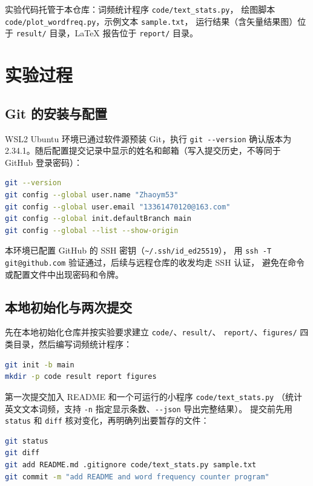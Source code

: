 \documentclass{SYSUReport}
\begin{document}
实验代码托管于本仓库：词频统计程序 \texttt{code/text\_stats.py}，
绘图脚本 \texttt{code/plot\_wordfreq.py}，示例文本 \texttt{sample.txt}，
运行结果（含矢量结果图）位于 \texttt{result/} 目录，LaTeX 报告位于 \texttt{report/} 目录。

\section{实验过程}

\subsection{Git 的安装与配置}

WSL2 Ubuntu 环境已通过软件源预装 Git，执行 \texttt{git -{}-version} 确认版本为
2.34.1。随后配置提交记录中显示的姓名和邮箱（写入提交历史，不等同于 GitHub 登录密码）：

\begin{lstlisting}[language=bash,caption={Git 安装确认与身份配置}]
git --version
git config --global user.name "Zhaoym53"
git config --global user.email "13361470120@163.com"
git config --global init.defaultBranch main
git config --global --list --show-origin
\end{lstlisting}

本环境已配置 GitHub 的 SSH 密钥（\texttt{\textasciitilde/.ssh/id\_ed25519}），
用 \texttt{ssh -T git@github.com} 验证通过，后续与远程仓库的收发均走 SSH 认证，
避免在命令或配置文件中出现密码和令牌。

\subsection{本地初始化与两次提交}

先在本地初始化仓库并按实验要求建立 \texttt{code/}、\texttt{result/}、
\texttt{report/}、\texttt{figures/} 四类目录，然后编写词频统计程序：

\begin{lstlisting}[language=bash,caption={仓库初始化}]
git init -b main
mkdir -p code result report figures
\end{lstlisting}

第一次提交加入 README 和一个可运行的小程序 \texttt{code/text\_stats.py}
（统计英文文本词频，支持 \texttt{-n} 指定显示条数、\texttt{-{}-json} 导出完整结果）。
提交前先用 \texttt{status} 和 \texttt{diff} 核对变化，再明确列出要暂存的文件：

\begin{lstlisting}[language=bash,caption={第一次提交：程序与说明}]
git status
git diff
git add README.md .gitignore code/text_stats.py sample.txt
git commit -m "add README and word frequency counter program"
\end{lstlisting}
\end{document}
